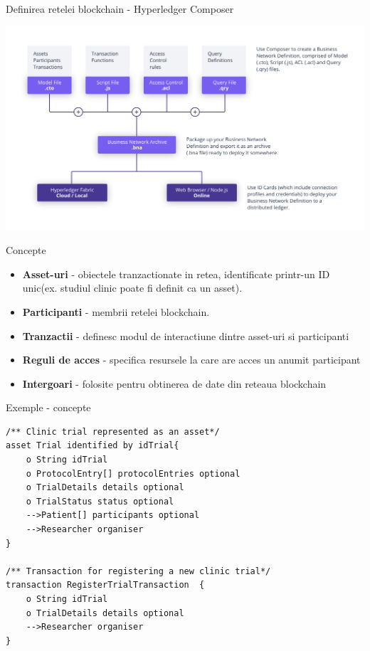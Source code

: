 \documentclass[10pt]{beamer}
\begin{document}
  \begin{frame}{Definirea retelei blockchain - Hyperledger Composer}
  		\begin{center}
  		\includegraphics[scale=0.4]{Composer-Diagram.png}
  		\end{center}
  \end{frame}   
  \begin{frame}{Concepte} 	
 	\begin{itemize}
 		\item \textbf{Asset-uri} - obiectele tranzactionate in retea, identificate printr-un ID unic(ex. studiul clinic poate fi definit ca un asset).
 		\item \textbf{Participanti} - membrii retelei blockchain. 
 		\item \textbf{Tranzactii} - definesc modul de interactiune dintre asset-uri si participanti
 		\item \textbf{Reguli de acces} - specifica resursele la care are acces un anumit participant
 		\item \textbf{Intergoari} - folosite pentru obtinerea de date din reteaua blockchain 
 	\end{itemize}
  \end{frame}
  \begin{frame}[fragile]{Exemple - concepte}
  	\begin{Verbatim}[fontsize=\small]
/** Clinic trial represented as an asset*/
asset Trial identified by idTrial{
    o String idTrial
    o ProtocolEntry[] protocolEntries optional
    o TrialDetails details optional
    o TrialStatus status optional
    -->Patient[] participants optional
    -->Researcher organiser
}

/** Transaction for registering a new clinic trial*/
transaction RegisterTrialTransaction  {
    o String idTrial
    o TrialDetails details optional
    -->Researcher organiser
}
  	\end{Verbatim}
  \end{frame}
\end{document}
